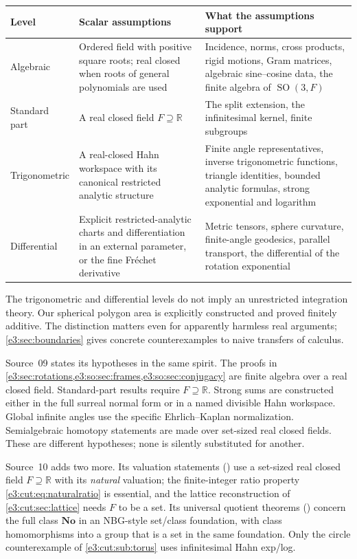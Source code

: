 \documentclass[11pt,letterpaper]{article}
\numberwithin{equation}{section}
\theoremstyle{definition}
\theoremstyle{remark}
\newcommand{\No}{\mathbf{No}}
\newcommand{\R}{\mathbb R}
\newcommand{\SO}{\operatorname{SO}}
\begin{document}
\begin{center}\small
\begin{tabular}{L{0.18\textwidth}L{0.34\textwidth}L{0.38\textwidth}}
\toprule
Level & Scalar assumptions & What the assumptions support\\
\midrule
Algebraic & Ordered field with positive square roots; real closed when roots of
 general polynomials are used & Incidence, norms, cross products, rigid motions,
 Gram matrices, algebraic sine--cosine data, the finite algebra of $\SO(3,F)$\\
Standard part & A real closed field $F\supseteq\R$ & The split extension,
 the infinitesimal kernel, finite subgroups\\
Trigonometric & A real-closed Hahn workspace with its canonical restricted
 analytic structure & Finite angle representatives, inverse trigonometric
 functions, triangle identities, bounded analytic formulas, strong
 exponential and logarithm\\
Differential & Explicit restricted-analytic charts and differentiation in an
 external parameter, or the fine Fr\'echet derivative & Metric tensors, sphere
 curvature, finite-angle geodesics, parallel transport, the differential of
 the rotation exponential\\
\bottomrule
\end{tabular}
\end{center}

The trigonometric and differential levels do not imply an unrestricted
integration theory. Our spherical polygon area is explicitly constructed and
proved finitely additive. The distinction matters even for apparently harmless
real arguments; \cref{e3:sec:boundaries} gives concrete counterexamples to naive
transfers of calculus.

Source~09 states its hypotheses in the same spirit. The proofs in
\cref{e3:sec:rotations,e3:so:sec:frames,e3:so:sec:conjugacy} are finite algebra over
a real closed field. Standard-part results require $F\supseteq\R$. Strong sums
are constructed either in the full surreal normal form or in a named divisible
Hahn workspace. Global infinite angles use the specific Ehrlich--Kaplan
normalization. Semialgebraic homotopy statements are made over set-sized real
closed fields. These are different hypotheses; none is silently substituted for
another.

Source~10 adds two more. Its valuation statements
() use a set-sized real closed
field $F\supseteq\R$ with its \emph{natural} valuation; the finite-integer ratio
property \cref{e3:cut:eq:naturalratio} is essential, and the lattice
reconstruction of \cref{e3:cut:sec:lattice} needs $F$ to be a set. Its universal
quotient theorems () concern the
full class $\No$ in an NBG-style set/class foundation, with class homomorphisms
into a group that is a set in the same foundation. Only the circle
counterexample of \cref{e3:cut:sub:torus} uses infinitesimal Hahn exp/log.
\end{document}
